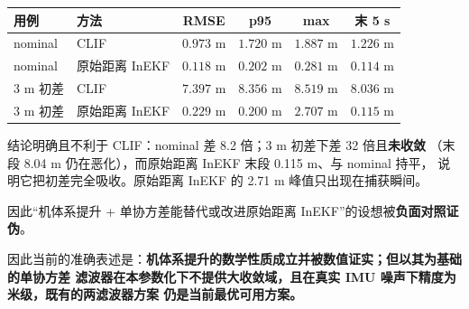 \documentclass[11pt,a4paper]{ctexart}
\begin{document}
\begin{center}
\small
\begin{tabular}{llcccc}
\toprule
用例 & 方法 & RMSE & p95 & max & 末 5 s \\
\midrule
nominal & CLIF & \(0.973\) m & \(1.720\) m & \(1.887\) m & \(1.226\) m \\
nominal & 原始距离 InEKF & \(\mathbf{0.118}\) m & \(0.202\) m & \(0.281\) m & \(\mathbf{0.114}\) m \\
3 m 初差 & CLIF & \(7.397\) m & \(8.356\) m & \(8.519\) m & \(8.036\) m \\
3 m 初差 & 原始距离 InEKF & \(\mathbf{0.229}\) m & \(0.200\) m & \(2.707\) m & \(\mathbf{0.115}\) m \\
\bottomrule
\end{tabular}
\end{center}

结论明确且不利于 CLIF：nominal 差 8.2 倍；3 m 初差下差 32 倍且\textbf{未收敛}
（末段 8.04 m 仍在恶化），而原始距离 InEKF 末段 0.115 m、与 nominal 持平，
说明它把初差完全吸收。原始距离 InEKF 的 2.71 m 峰值只出现在捕获瞬间。

因此“机体系提升 + 单协方差能替代或改进原始距离 InEKF”的设想被\textbf{负面对照证伪}。

因此当前的准确表述是：\textbf{机体系提升的数学性质成立并被数值证实；但以其为基础的单协方差
滤波器在本参数化下不提供大收敛域，且在真实 IMU 噪声下精度为米级，既有的两滤波器方案
仍是当前最优可用方案。}
\end{document}
